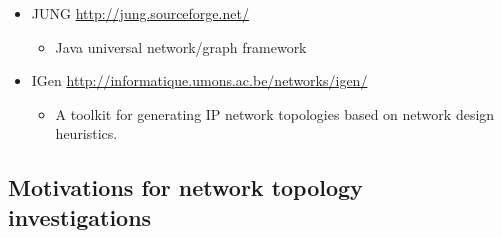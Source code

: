 \begin{itemize}
  \item JUNG \url{http://jung.sourceforge.net/}
    \begin{itemize}
    \item Java universal network/graph framework
    \end{itemize}

  \item IGen \url{http://informatique.umons.ac.be/networks/igen/}
    \begin{itemize}
    \item A toolkit for generating IP network topologies based on
      network design heuristics. 
    \end{itemize}

  \end{itemize}

\subsection{Motivations for network topology investigations}

